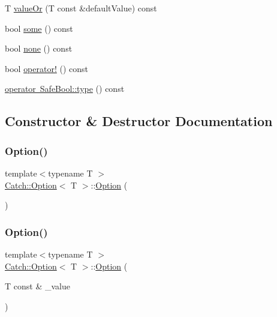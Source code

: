 \begin{DoxyCompactItemize}
\item 
T \mbox{\hyperlink{class_catch_1_1_option_a8d9ae2e30b0eb76fe134a6fbc8423124}{value\+Or}} (T const \&default\+Value) const
\item 
bool \mbox{\hyperlink{class_catch_1_1_option_a97c95829afbe92f2bcc5fd75b32c0825}{some}} () const
\item 
bool \mbox{\hyperlink{class_catch_1_1_option_a821753afdc3fac947a13a01fbe0d248e}{none}} () const
\item 
bool \mbox{\hyperlink{class_catch_1_1_option_a96dccb86bdf45ee0c08e122b6133bef3}{operator!}} () const
\item 
\mbox{\hyperlink{class_catch_1_1_option_a8ed8de7b072f893c85df14913dbbe197}{operator Safe\+Bool\+::type}} () const
\end{DoxyCompactItemize}


\subsection{Constructor \& Destructor Documentation}
\mbox{\label{class_catch_1_1_option_a8efb01b593d798decc80cbbdf311f2a3}} 
\subsubsection{\texorpdfstring{Option()}{Option()}\hspace{0.1cm}{\footnotesize\ttfamily [1/3]}}
{\footnotesize\ttfamily template$<$typename T $>$ \\
\mbox{\hyperlink{class_catch_1_1_option}{Catch\+::\+Option}}$<$ T $>$\+::\mbox{\hyperlink{class_catch_1_1_option}{Option}} (\begin{DoxyParamCaption}{ }\end{DoxyParamCaption})\hspace{0.3cm}{\ttfamily [inline]}}

\mbox{\label{class_catch_1_1_option_a5aeb9c22d48a6882bdf5fb4730b06c86}} 
\subsubsection{\texorpdfstring{Option()}{Option()}\hspace{0.1cm}{\footnotesize\ttfamily [2/3]}}
{\footnotesize\ttfamily template$<$typename T $>$ \\
\mbox{\hyperlink{class_catch_1_1_option}{Catch\+::\+Option}}$<$ T $>$\+::\mbox{\hyperlink{class_catch_1_1_option}{Option}} (\begin{DoxyParamCaption}\item[{T const \&}]{\+\_\+value }\end{DoxyParamCaption})\hspace{0.3cm}{\ttfamily [inline]}}

